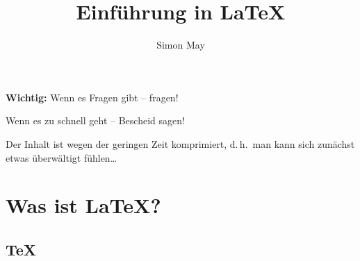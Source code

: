 




\title{Einführung in \LaTeX}
\subject{\LaTeX-Kurs}
\author[Simon May]{Simon May\texorpdfstring{\\}{, }}
\date{}



\frame{\titlepage}

\begin{frame}
	\begin{center}
		{\Large
		\textbf{Wichtig:} Wenn es Fragen gibt – fragen!
		
		\medskip
		Wenn es zu schnell geht – Bescheid sagen!}
		
		\bigskip
		Der Inhalt ist wegen der geringen Zeit komprimiert, d.\,h.\ man kann sich zunächst etwas überwältigt fühlen\dots
	\end{center}
\end{frame}

\section{Was ist \LaTeX?}
\subsection{\TeX}

